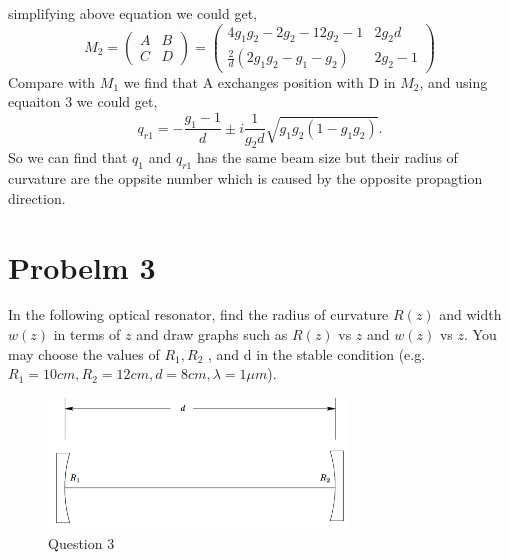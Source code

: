 \documentclass{article}
\begin{document}
simplifying above equation we could get,
\begin{equation}
	M_2=
	\begin{pmatrix}
	A & B\\
	C & D
	\end{pmatrix}
	=
	\begin{pmatrix}
	4g_{1}g_{2}-2g_2-12g_2-1 & 2g_2d \\
	\frac{2}{d}(2g_{1}g_{2}-g_{1}-g_{2}) & 2g_2-1
	\end{pmatrix}
\end{equation}
Compare with $M_1$ we find that A exchanges position with D in $M_2$, and using  equaiton 3 we could get,
\begin{equation}
	q_{r1}=-\frac{g_1-1}{d}\pm i\frac{1}{g_2d}\sqrt{g_{1}g_{2}(1-g_1g_{2})}.
\end{equation}
So we can find that $q_1$ and $q_{r1}$ has the same beam size but their radius of curvature are the oppsite number which is caused by the opposite propagtion direction.
\section{Probelm 3}
In the following optical resonator, find the radius of curvature $R(z)$ and width $ w(z) $ in terms of $ z  $ and draw graphs such as $ R(z) $ vs $  z $ and $ w(z) $  vs  $ z $. You may choose the values of $ R_1 ,R_2 $ , and d in the stable condition (e.g. $ R_1 = 10 cm, R_2 = 12 cm, d = 8 cm, \lambda= 1 \mu m $).
\begin{figure}[htb]
	\centering
	\includegraphics[width=8cm]{question3.png}
	\caption{Question 3}
\end{figure}
\end{document}
